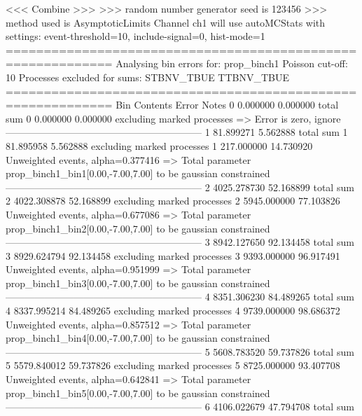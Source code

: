  <<< Combine >>> 
>>> random number generator seed is 123456
>>> method used is AsymptoticLimits
Channel ch1 will use autoMCStats with settings: event-threshold=10, include-signal=0, hist-mode=1
============================================================
Analysing bin errors for: prop_binch1
Poisson cut-off: 10
Processes excluded for sums: STBNV_TBUE TTBNV_TBUE
============================================================
Bin        Contents        Error           Notes                         
0          0.000000        0.000000        total sum                     
0          0.000000        0.000000        excluding marked processes    
  => Error is zero, ignore      
------------------------------------------------------------
1          81.899271       5.562888        total sum                     
1          81.895958       5.562888        excluding marked processes    
1          217.000000      14.730920       Unweighted events, alpha=0.377416
  => Total parameter prop_binch1_bin1[0.00,-7.00,7.00] to be gaussian constrained
------------------------------------------------------------
2          4025.278730     52.168899       total sum                     
2          4022.308878     52.168899       excluding marked processes    
2          5945.000000     77.103826       Unweighted events, alpha=0.677086
  => Total parameter prop_binch1_bin2[0.00,-7.00,7.00] to be gaussian constrained
------------------------------------------------------------
3          8942.127650     92.134458       total sum                     
3          8929.624794     92.134458       excluding marked processes    
3          9393.000000     96.917491       Unweighted events, alpha=0.951999
  => Total parameter prop_binch1_bin3[0.00,-7.00,7.00] to be gaussian constrained
------------------------------------------------------------
4          8351.306230     84.489265       total sum                     
4          8337.995214     84.489265       excluding marked processes    
4          9739.000000     98.686372       Unweighted events, alpha=0.857512
  => Total parameter prop_binch1_bin4[0.00,-7.00,7.00] to be gaussian constrained
------------------------------------------------------------
5          5608.783520     59.737826       total sum                     
5          5579.840012     59.737826       excluding marked processes    
5          8725.000000     93.407708       Unweighted events, alpha=0.642841
  => Total parameter prop_binch1_bin5[0.00,-7.00,7.00] to be gaussian constrained
------------------------------------------------------------
6          4106.022679     47.794708       total sum                     
